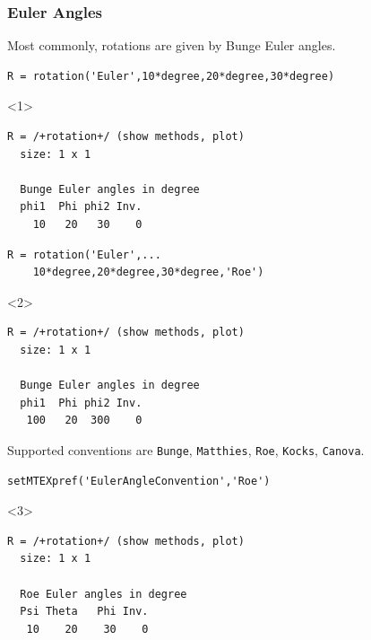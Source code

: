 \documentclass[compress]{beamer}
\begin{document}
\begin{frame}[fragile]
  \frametitle{Euler Angles}
  \begin{overlayarea}{\textwidth}{8cm}

  Most commonly, rotations are given by Bunge Euler angles.

  \begin{lstlisting}[style=input]
R = rotation('Euler',10*degree,20*degree,30*degree)
  \end{lstlisting}
  \begin{onlyenv}<1>
    \vspace{-0.3cm}
  \begin{lstlisting}[style=output]
R = /+rotation+/ (show methods, plot)
  size: 1 x 1

  Bunge Euler angles in degree
  phi1  Phi phi2 Inv.
    10   20   30    0
  \end{lstlisting}
  \end{onlyenv}

  \pause
  \medskip

  \begin{lstlisting}[style=input]
R = rotation('Euler',...
    10*degree,20*degree,30*degree,'Roe')
  \end{lstlisting}
  \begin{onlyenv}<2>
    \vspace{-0.3cm}
  \begin{lstlisting}[style=output]
R = /+rotation+/ (show methods, plot)
  size: 1 x 1

  Bunge Euler angles in degree
  phi1  Phi phi2 Inv.
   100   20  300    0
  \end{lstlisting}
\end{onlyenv}

\pause
\medskip

Supported conventions are \texttt{Bunge}, \texttt{Matthies}, \texttt{Roe},
\texttt{Kocks}, \texttt{Canova}.
  \begin{lstlisting}[style=input]
setMTEXpref('EulerAngleConvention','Roe')
  \end{lstlisting}

  \begin{onlyenv}<3>
    \vspace{-0.3cm}
  \begin{lstlisting}[style=output]
R = /+rotation+/ (show methods, plot)
  size: 1 x 1

  Roe Euler angles in degree
  Psi Theta   Phi Inv.
   10    20    30    0
 \end{lstlisting}
\end{onlyenv}
\end{overlayarea}
\end{frame}
\end{document}

